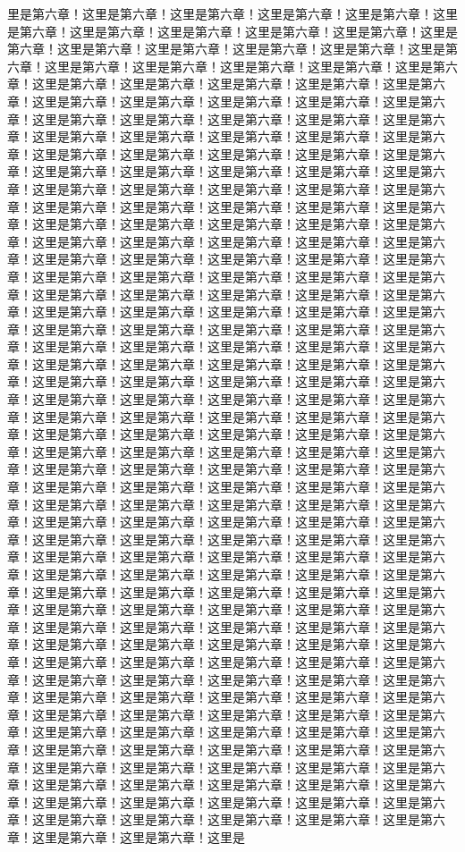 里是第六章！这里是第六章！这里是第六章！这里是第六章！这里是第六章！这里是第六章！这里是第六章！这里是第六章！这里是第六章！这里是第六章！这里是第六章！这里是第六章！这里是第六章！这里是第六章！这里是第六章！这里是第六章！这里是第六章！这里是第六章！这里是第六章！这里是第六章！这里是第六章！这里是第六章！这里是第六章！这里是第六章！这里是第六章！这里是第六章！这里是第六章！这里是第六章！这里是第六章！这里是第六章！这里是第六章！这里是第六章！这里是第六章！这里是第六章！这里是第六章！这里是第六章！这里是第六章！这里是第六章！这里是第六章！这里是第六章！这里是第六章！这里是第六章！这里是第六章！这里是第六章！这里是第六章！这里是第六章！这里是第六章！这里是第六章！这里是第六章！这里是第六章！这里是第六章！这里是第六章！这里是第六章！这里是第六章！这里是第六章！这里是第六章！这里是第六章！这里是第六章！这里是第六章！这里是第六章！这里是第六章！这里是第六章！这里是第六章！这里是第六章！这里是第六章！这里是第六章！这里是第六章！这里是第六章！这里是第六章！这里是第六章！这里是第六章！这里是第六章！这里是第六章！这里是第六章！这里是第六章！这里是第六章！这里是第六章！这里是第六章！这里是第六章！这里是第六章！这里是第六章！这里是第六章！这里是第六章！这里是第六章！这里是第六章！这里是第六章！这里是第六章！这里是第六章！这里是第六章！这里是第六章！这里是第六章！这里是第六章！这里是第六章！这里是第六章！这里是第六章！这里是第六章！这里是第六章！这里是第六章！这里是第六章！这里是第六章！这里是第六章！这里是第六章！这里是第六章！这里是第六章！这里是第六章！这里是第六章！这里是第六章！这里是第六章！这里是第六章！这里是第六章！这里是第六章！这里是第六章！这里是第六章！这里是第六章！这里是第六章！这里是第六章！这里是第六章！这里是第六章！这里是第六章！这里是第六章！这里是第六章！这里是第六章！这里是第六章！这里是第六章！这里是第六章！这里是第六章！这里是第六章！这里是第六章！这里是第六章！这里是第六章！这里是第六章！这里是第六章！这里是第六章！这里是第六章！这里是第六章！这里是第六章！这里是第六章！这里是第六章！这里是第六章！这里是第六章！这里是第六章！这里是第六章！这里是第六章！这里是第六章！这里是第六章！这里是第六章！这里是第六章！这里是第六章！这里是第六章！这里是第六章！这里是第六章！这里是第六章！这里是第六章！这里是第六章！这里是第六章！这里是第六章！这里是第六章！这里是第六章！这里是第六章！这里是第六章！这里是第六章！这里是第六章！这里是第六章！这里是第六章！这里是第六章！这里是第六章！这里是第六章！这里是第六章！这里是第六章！这里是第六章！这里是第六章！这里是第六章！这里是第六章！这里是第六章！这里是第六章！这里是第六章！这里是第六章！这里是第六章！这里是第六章！这里是第六章！这里是第六章！这里是第六章！这里是第六章！这里是第六章！这里是第六章！这里是第六章！这里是第六章！这里是第六章！这里是第六章！这里是第六章！这里是第六章！这里是第六章！这里是第六章！这里是第六章！这里是第六章！这里是第六章！这里是第六章！这里是第六章！这里是第六章！这里是第六章！这里是第六章！这里是第六章！这里是第六章！这里是第六章！这里是第六章！这里是第六章！这里是第六章！这里是第六章！这里是第六章！这里是第六章！这里是第六章！这里是第六章！这里是第六章！这里是第六章！这里是第六章！这里是第六章！这里是第六章！这里是第六章！这里是第六章！这里是第六章！这里是第六章！这里是第六章！这里是第六章！这里是第六章！这里是第六章！这里是第六章！这里是第六章！这里是第六章！这里是第六章！这里是第六章！这里是第六章！这里是第六章！这里是第六章！这里是第六章！这里是第六章！这里是第六章！这里是第六章！这里是第六章！这里是